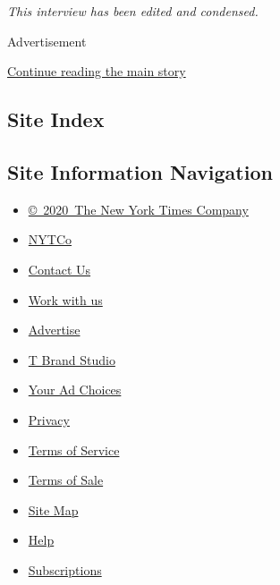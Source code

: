 \emph{This interview has been edited and condensed.}

Advertisement

\protect\hyperlink{after-bottom}{Continue reading the main story}

\hypertarget{site-index}{%
\subsection{Site Index}\label{site-index}}

\hypertarget{site-information-navigation}{%
\subsection{Site Information
Navigation}\label{site-information-navigation}}

\begin{itemize}
\tightlist
\item
  \href{https://help.nytimes3xbfgragh.onion/hc/en-us/articles/115014792127-Copyright-notice}{©~2020~The
  New York Times Company}
\end{itemize}

\begin{itemize}
\tightlist
\item
  \href{https://www.nytco.com/}{NYTCo}
\item
  \href{https://help.nytimes3xbfgragh.onion/hc/en-us/articles/115015385887-Contact-Us}{Contact
  Us}
\item
  \href{https://www.nytco.com/careers/}{Work with us}
\item
  \href{https://nytmediakit.com/}{Advertise}
\item
  \href{http://www.tbrandstudio.com/}{T Brand Studio}
\item
  \href{https://www.nytimes3xbfgragh.onion/privacy/cookie-policy\#how-do-i-manage-trackers}{Your
  Ad Choices}
\item
  \href{https://www.nytimes3xbfgragh.onion/privacy}{Privacy}
\item
  \href{https://help.nytimes3xbfgragh.onion/hc/en-us/articles/115014893428-Terms-of-service}{Terms
  of Service}
\item
  \href{https://help.nytimes3xbfgragh.onion/hc/en-us/articles/115014893968-Terms-of-sale}{Terms
  of Sale}
\item
  \href{https://spiderbites.nytimes3xbfgragh.onion}{Site Map}
\item
  \href{https://help.nytimes3xbfgragh.onion/hc/en-us}{Help}
\item
  \href{https://www.nytimes3xbfgragh.onion/subscription?campaignId=37WXW}{Subscriptions}
\end{itemize}
